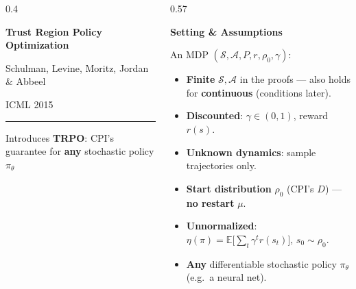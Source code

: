\documentclass[aspectratio=169]{beamer}
\newcommand{\E}{\mathbb{E}}
\begin{document}
\begin{frame}
  \begin{columns}[c]
    \begin{column}{0.4\textwidth}
      \begin{tcolorbox}[colback=AtlasCool, colframe=AtlasCool, arc=3pt, boxrule=0pt,
                        height=0.8\textheight, valign=center, left=12pt, right=12pt]
        \color{white}\raggedright
        {\Large\bfseries Trust Region Policy Optimization\par}
        \vspace{12pt}
        {\large Schulman, Levine, Moritz, Jordan \& Abbeel\par}
        {\small ICML 2015\par}
        \vspace{16pt}
        {\color{white!80!AtlasCool}\rule{0.4\linewidth}{0.6pt}\par}
        \vspace{6pt}
        {\small Introduces \textbf{TRPO}: CPI's guarantee for \textbf{any} stochastic policy $\pi_\theta$\par}
      \end{tcolorbox}
    \end{column}
    \begin{column}{0.57\textwidth}
      {\large\bfseries\color{AtlasAccent}Setting \& Assumptions\par}
      \vspace{6pt}
      \small
      An MDP $(\mathcal{S}, \mathcal{A}, P, r, \rho_0, \gamma)$:
      \begin{itemize}
        \item \textbf{Finite} $\mathcal{S}, \mathcal{A}$ in the proofs --- also holds for \textbf{continuous} (conditions later).
        \item \textbf{Discounted}: $\gamma \in (0,1)$, reward $r(s)$.
        \item \textbf{Unknown dynamics}: sample trajectories only.
        \item \textbf{Start distribution} $\rho_0$ (CPI's $D$) --- {\color{BadRed}\textbf{no restart} $\mu$}.
        \item \textbf{Unnormalized}: $\eta(\pi) = \E\big[\sum_{t} \gamma^t r(s_t)\big]$, $s_0\sim\rho_0$.
        \item \textbf{Any} differentiable stochastic policy $\pi_\theta$ (e.g.\ a neural net).
      \end{itemize}
    \end{column}
  \end{columns}
\end{frame}
\end{document}
